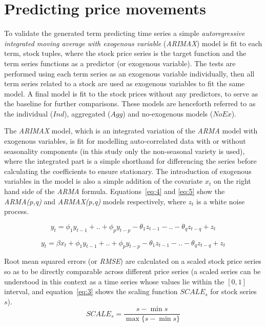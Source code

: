 \documentclass[conference,11pt]{IEEEtran}
\begin{document}
\section{Predicting price movements}
To validate the generated term predicting time series a simple \textit{autoregressive integrated moving average with exogenous variable} (\textit{ARIMAX}) model is fit to each term, stock tuples, where the stock price series is the target function and the term series functions as a predictor (or exogenous variable). The tests are performed using each term series as an exogenous variable individually, then all term series related to a stock are used as exogenous variables to fit the same model. A final model is fit to the stock prices without any predictors, to serve as the baseline for further comparisons. These models are henceforth referred to as the individual (\(Ind\)), aggregated (\(Agg\)) and no-exogenous models (\(NoEx\)).

\par
The \textit{ARIMAX} model, which is an integrated variation of the \textit{ARMA} model with exogenous variables, is fit for modelling auto-correlated data with or without seasonality components (in this study only the non-seasonal variety is used), where the integrated part is a simple shorthand for differencing the series before calculating the coefficients to ensure stationary. The introduction of exogenous variables in the model is also a simple addition of the covariate \(x_t\) on the right hand side of the \textit{ARMA} formula. Equations~\ref{eq:4} and \ref{eq:5} show the \textit{ARMA(p,q)} and \textit{ARMAX(p,q)} models respectively, where \(z_t\) is a white noise process.

\begin{equation}
\label{eq:4}
y_t=\phi_1 y_{t-1} + .. + \phi_p y_{t-p} - 
\theta_1 z_{t-1} - .. - \theta_q z_{t-q} +
z_t
\end{equation}

\begin{equation}
\label{eq:5}
y_t=\beta x_t + \phi_1 y_{t-1} + .. + \phi_p y_{t-p} - 
\theta_1 z_{t-1} - .. - \theta_q z_{t-q} +
z_t
\end{equation}

\par
Root mean squared errors (or \textit{RMSE}) are calculated on a scaled stock price series so as to be directly comparable across different price series (a scaled series can be understood in this context as a time series whose values lie within the \([0,1]\) interval, and equation~\ref{eq:3} shows the scaling function \(SCALE_{s}\) for stock series \(s\)).
\begin{equation}
\label{eq:3}
SCALE_{s}=\frac{s-\min s}{\max \{s-\min s\}}
\end{equation}
\end{document}
